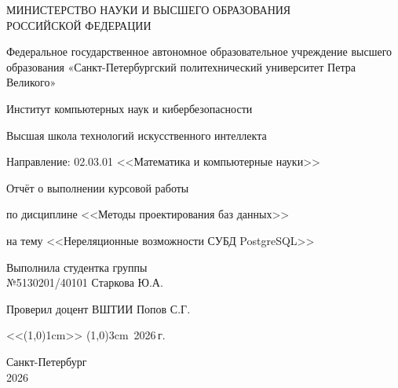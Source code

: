 \thispagestyle{empty} %

\begin{center}
    МИНИСТЕРСТВО НАУКИ И ВЫСШЕГО ОБРАЗОВАНИЯ\\ РОССИЙСКОЙ ФЕДЕРАЦИИ

    Федеральное государственное автономное образовательное учреждение высшего образования «Санкт-Петербургский политехнический университет Петра Великого»

    Институт компьютерных наук и кибербезопасности

    Высшая школа технологий искусственного интеллекта

    Направление: 02.03.01 <<Математика и компьютерные науки>>

    \vspace{3cm}
    {\Large
        Отчёт о выполнении курсовой работы

        по дисциплине <<Методы проектирования баз данных>>

        на тему <<Нереляционные возможности СУБД PostgreSQL>>


    }
    \vspace{3cm}

    \begin{minipage}{\textwidth}
        Выполнила студентка группы \\
        №5130201/40101 \hfill Старкова Ю.А.

        \vspace{0.5cm}

        Проверил доцент ВШТИИ
        \hfill Попов С.Г.
    \end{minipage}

    \vspace{1cm}
    \hfill
    <<\line(1,0){1cm}>> \line(1,0){3cm}\, 2026\,г.

    \vspace{2cm}
    Санкт-Петербург \\
    2026
\end{center}